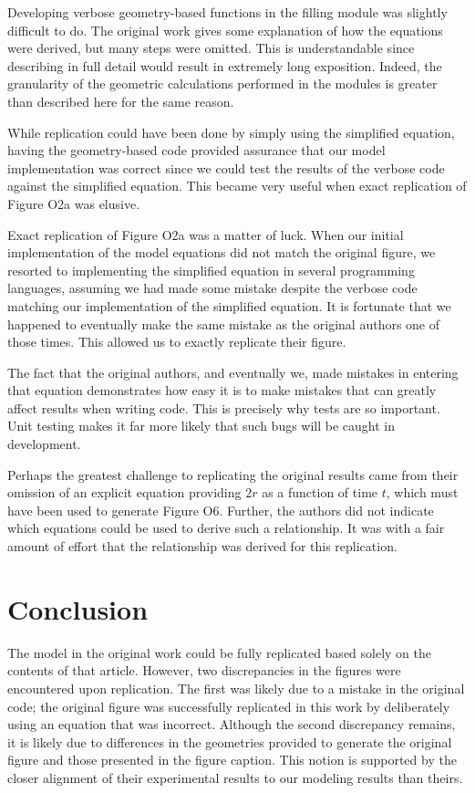 Developing verbose geometry-based functions in the filling module was slightly difficult to do.
The original work gives some explanation of how the equations were derived, but many steps were
omitted. This is understandable since describing in full detail would result in extremely long
exposition. Indeed, the granularity of the geometric calculations performed in the modules
is greater than described here for the same reason.

While replication could have been done by simply using the simplified equation, having
the geometry-based code provided assurance that our model implementation was correct since
we could test the results of the verbose code against the simplified equation. This became very
useful when exact replication of Figure O2a was elusive.

Exact replication of Figure O2a was a matter of luck. When our initial implementation of the
model equations did not match the original figure, we resorted to implementing the simplified
equation in several programming languages, assuming we had made some mistake despite the
verbose code matching our implementation of the simplified equation. It is fortunate that we
happened to eventually make the same mistake as the original authors one of those times. This
allowed us to exactly replicate their figure.

The fact that the original authors, and eventually we, made mistakes in entering that equation
demonstrates how easy it is to make mistakes that can greatly affect results when writing code.
This is precisely why tests are so important. Unit testing makes it far more likely that
such bugs will be caught in development.

Perhaps the greatest challenge to replicating the original results came from their
omission of an explicit equation providing $2r$ as a function of time $t$, which must have been
used to generate Figure O6. Further, the authors did not indicate which equations could be used to
derive such a relationship. It was with a fair amount of effort that the relationship
was derived for this replication.

\section{Conclusion}

The model in the original work could be fully replicated based solely on the contents of
that article. However, two discrepancies in the figures were encountered upon replication.
The first was likely due to a mistake in the original code; the original figure was successfully
replicated in this work by deliberately using an equation that was incorrect.
Although the second discrepancy remains, it is likely due to differences
in the geometries provided to generate the original figure and those presented in the figure caption.
This notion is supported by the closer alignment of their experimental results to our modeling results
than theirs.


